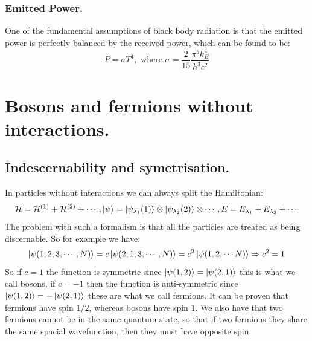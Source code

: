 \documentclass[10pt,a4paper]{book}
\begin{document}
\subsubsection{Emitted Power.}
One of the fundamental assumptions of black body radiation is that the emitted power is perfectly balanced by the received power, which can be found to be:
\[
P = \sigma T^4 , \text{ where } \sigma = \frac{2}{15} \frac{\pi^5 k_B^4}{h^3 c^2}
\]

\section{Bosons and fermions without interactions.}
\subsection{Indescernability and symetrisation.}
In particles without interactions we can always split the Hamiltonian:
\[
\mathcal{H} = \mathcal{H}^{(1)} + \mathcal{H}^{(2)} + \cdots, \ket \psi = \ket{\psi_{\lambda_1}(1)} \otimes \ket{\psi_{\lambda_2}(2) }\otimes \cdots, E = E_{\lambda_1} + E_{\lambda_2} + \cdots
\]
The problem with such a formalism is that all the particles are treated as being discernable. So for example we have:
\[
\ket{\psi(1, 2, 3, \cdots, N)} = c \ket{\psi(2, 1, 3, \cdots, N)} = c^2 \ket{\psi(1, 2, \cdots N)} \Rightarrow c^2 = 1
\]
So if $c = 1$ the function is symmetric since $\ket{\psi(1,2)} = \ket{\psi(2, 1)}$ this is what we call bosons, if $c = -1$ then the function is anti-symmetric since $\ket{\psi(1,2)} = -\ket{\psi(2, 1)}$ these are what we call fermions. It can be proven that fermions have spin $1/2$, whereas bosons have spin $1$. We also have that two fermions cannot be in the same quantum state, so that if two fermions they share the same spacial wavefunction, then they must have opposite spin. 
\end{document}
